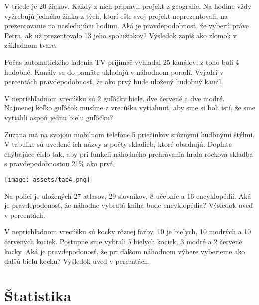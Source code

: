 \begin{example}
	V triede je 20 žiakov. Každý z nich pripravil projekt z geografie. Na hodine vždy vyžrebujú jedného žiaka z tých, ktorí ešte svoj projekt neprezentovali, na prezentovanie na nasledujúcu hodinu. Aká je pravdepodobnosť, že vyberú práve Petra, ak už prezentovalo 13 jeho spolužiakov? Výsledok zapíš ako zlomok v základnom tvare.
\end{example}

\begin{example}
	Počas automatického ladenia TV prijímač vyhľadal 25 kanálov, z toho boli 4 hudobné. Kanály sa do pamäte ukladajú v náhodnom poradí. Vyjadri v percentách pravdepodobnosť, že ako prvý bude uložený hudobný kanál.
\end{example}

\begin{example}
	V nepriehľadnom vrecúšku sú 2 guľôčky biele, dve červené a dve modré. Najmenej koľko guľôčok musíme z vrecúška vytiahnuť, aby sme si boli istí, že sme vytiahli aspoň jednu bielu guľôčku?
\end{example}

\begin{example}
	Zuzana má na svojom mobilnom telefóne 5 priečinkov  srôznymi hudbnými štýlmi. V tabuľke sú uvedené ich názvy a počty skladieb, ktoré obsahujú. Doplnte chýbajúce číslo tak, aby pri funkcii náhodného prehrávania hrala rocková skladba s pravdepodobnosťou 21\% ako prvá. 
	
	\begin{center}
		\texttt{[image: assets/tab4.png]}
	\end{center}
\end{example}

\begin{example}
	Na polici je uložených 27 atlasov, 29 slovníkov, 8 učebníc a 16 encyklopédií. Aká je pravdepodonosť, že náhodne vybratá kniha bude encyklopédia? Výsledok uveď v percentách.
\end{example}

\begin{example}
	V nepriehľadnom vrecúšku sú kocky rôznej farby. 10 je bielych, 10 modrých a 10 červených kociek. Postupne sme vybrali 5 bielych kociek,  3 modré a 2 červené kocky. Aká je pravdepodonosť, že pri ďalšom náhodnom výbere vyberieme ako ďalšú bielu kocku? Výsledok uveď v percentách.
\end{example}

\section{Štatistika}

